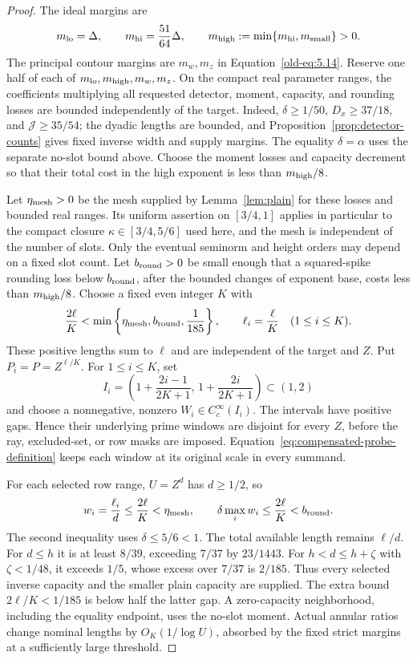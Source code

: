 \documentclass[11pt,a4paper]{article}
\numberwithin{equation}{section}
\numberwithin{figure}{section}
\theoremstyle{definition}
\theoremstyle{remark}
\begin{document}
\begin{proof}
The ideal margins are
\[
 m_{\rm lo}=\Delta,\qquad m_{\rm hi}=\frac{51}{64}\Delta,\qquad
 m_{\rm high}:=\min\{m_{\rm hi},m_{\rm small}\}>0.
\]
The principal contour margins are \(m_w,m_z\) in
Equation~\eqref{old-eq:5.14}.  Reserve one half of each of
\(m_{\rm lo},m_{\rm high},m_w,m_z\).  On the compact real parameter
ranges, the coefficients multiplying all requested detector, moment,
capacity, and rounding losses are bounded independently of the target.
Indeed, \(\delta\ge1/50\), \(D_x\ge37/18\), and
\(\mathcal J\ge35/54\); the dyadic lengths are bounded, and
Proposition~\ref{prop:detector-counts} gives fixed inverse width and
supply margins.  The equality \(\delta=\alpha\) uses the separate
no-slot bound above.  Choose the moment losses and capacity decrement
so that their total cost in the high exponent is less than
\(m_{\rm high}/8\).

Let \(\eta_{\rm mesh}>0\) be the mesh supplied by
Lemma~\ref{lem:plain} for these losses and bounded real ranges.  Its
uniform assertion on \([3/4,1]\) applies in particular to the compact
closure \(\kappa\in[3/4,5/6]\) used here, and the mesh is independent
of the number of slots.  Only the eventual seminorm and height orders
may depend on a fixed slot count.  Let \(b_{\rm round}>0\) be small
enough that a squared-spike rounding loss below \(b_{\rm round}\), after
the bounded changes of exponent base, costs less than \(m_{\rm high}/8\).
Choose a fixed even integer \(K\) with
\[
 \frac{2\ell}{K}<
 \min\left\{\eta_{\rm mesh},b_{\rm round},\frac1{185}\right\},
 \qquad \ell_i=\frac{\ell}{K}\quad(1\le i\le K).
\]
These positive lengths sum to \(\ell\) and are independent of the
target and \(Z\).  Put \(P_i=P=Z^{\ell/K}\).  For \(1\le i\le K\), set
\[
 I_i=\left(1+\frac{2i-1}{2K+1},\,1+\frac{2i}{2K+1}\right)\subset(1,2)
\]
and choose a nonnegative, nonzero \(W_i\in C_c^\infty(I_i)\).
The intervals have positive gaps.  Hence their underlying prime windows
are disjoint for every \(Z\), before the ray, excluded-set, or row masks
are imposed.  Equation~\eqref{eq:compensated-probe-definition} keeps each
window at its original scale in every summand.

For each selected row range, \(U=Z^d\) has \(d\ge1/2\), so
\[
 w_i=\frac{\ell_i}{d}\le\frac{2\ell}{K}<\eta_{\rm mesh},
 \qquad
 \delta\max_iw_i\le\frac{2\ell}{K}<b_{\rm round}.
\]
The second inequality uses \(\delta\le5/6<1\).  The total available
length remains \(\ell/d\).  For \(d\le h\) it is at least \(8/39\),
exceeding \(7/37\) by \(23/1443\).  For \(h<d\le h+\zeta\) with
\(\zeta<1/48\), it exceeds \(1/5\), whose excess over \(7/37\) is
\(2/185\).  Thus every selected inverse capacity and the smaller
plain capacity are supplied.  The extra bound \(2\ell/K<1/185\)
is below half the latter gap.  A zero-capacity neighborhood, including
the equality endpoint, uses the no-slot moment.  Actual annular ratios
change nominal lengths by \(O_K(1/\log U)\), absorbed by the fixed
strict margins at a sufficiently large threshold.


\end{proof}
\end{document}
